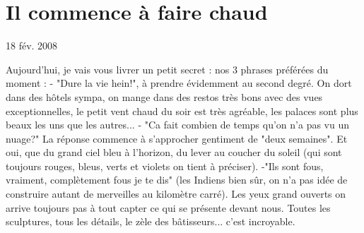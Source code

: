 \section{Il commence à faire chaud}

18 fév. 2008

\begin{multicols}{2}

Aujourd'hui, je vais vous livrer un petit secret : nos 3 phrases préférées du moment :
- "Dure la vie hein!", à prendre évidemment au second degré. On dort dans des hôtels sympa, on mange dans des restos très bons avec des vues exceptionnelles, le petit vent chaud du soir est très agréable, les palaces sont plus beaux les uns que les autres...
- "Ca fait combien de temps qu'on n'a pas vu un nuage?" La réponse commence à s'approcher gentiment de "deux semaines". Et oui, que du grand ciel bleu à l'horizon, du lever au coucher du soleil (qui sont toujours rouges, bleus, verts et violets on tient à préciser).
-"Ils sont fous, vraiment, complètement fous je te dis" (les Indiens bien sûr, on n'a pas idée de construire autant de merveilles au kilomètre carré). Les yeux grand ouverts on arrive toujours pas à tout capter ce qui se présente devant nous. Toutes les sculptures, tous les détails, le zèle des bâtisseurs... c'est incroyable.


\end{multicols}
